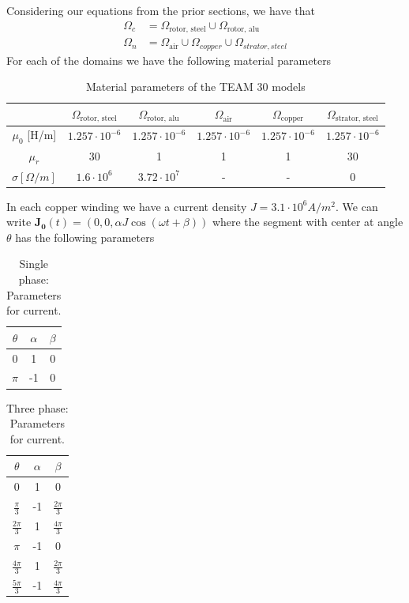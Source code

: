 \documentclass{article}
\newcommand{\mbf}[1]{\mathbf{#1}}
\begin{document}
Considering our equations from the prior sections, we have that
\begin{align}
    \Omega_c &= \Omega_{\text{rotor, steel}}\cup \Omega_{\text{rotor, alu}}\\
    \Omega_n &= \Omega_{\text{air}}\cup \Omega_{copper}\cup \Omega_{strator, steel}
\end{align}
For each of the domains we have the following material parameters
\begin{table}[!ht]
    \centering
    \begin{tabular}{|c|c|c|c|c|c|}\hline
         &  $\Omega_{\text{rotor, steel}}$ &  $\Omega_{\text{rotor, alu}}$ & $\Omega_{\text{air}}$ & $\Omega_{\text{copper}}$ & $\Omega_{\text{strator, steel}}$ \\\hline
        $\mu_0$ [H/m] &   $1.257\cdot 10^{-6}$ & $1.257\cdot 10^{-6}$ & $1.257\cdot 10^{-6}$ & $1.257\cdot 10^{-6}$ &  $1.257\cdot 10^{-6}$\\\hline
        $\mu_r$ & 30 & 1 & 1 & 1 & 30 \\\hline
        $\sigma [\Omega/m]$  & $1.6\cdot10^6$ & $3.72\cdot10^7$ & - & - &0 \\\hline
    \end{tabular}
    \caption{Material parameters of the TEAM 30 models}
    \label{tab:mat_params}
\end{table}

In each copper winding we have a current density $J=3.1\cdot 10^6 A/m^2$.
We can write $\mbf{J_0}(t)=(0,0,\alpha J\cos(\omega t + \beta))$ where the segment with center at angle $\theta$ has the following parameters
\begin{table}[!ht]
    \centering
    \begin{tabular}{|c|c|c|}\hline
    $\theta$& $\alpha$ & $\beta$  \\\hline
    0 & 1 & 0  \\\hline
    $\pi$ & -1 & 0 \\\hline
    \end{tabular}
    \caption{Single phase: Parameters for current.}
    \label{tab:single}
\end{table}

\begin{table}[!ht]
    \centering
    \begin{tabular}{|c|c|c|}\hline
    $\theta$& $\alpha$ & $\beta$  \\\hline
    0 & 1 & 0  \\\hline
    $\frac{\pi}{3}$ & -1 & $\frac{2\pi}{3}$ \\\hline
    $\frac{2\pi}{3}$ & 1 & $\frac{4\pi}{3}$ \\\hline
    $\pi$ & -1 & 0\\\hline
    $\frac{4\pi}{3}$ & 1 & $\frac{2\pi}{3}$ \\\hline
    $\frac{5\pi}{3}$ & -1 & $\frac{4\pi}{3}$\\\hline
    \end{tabular}
    \caption{Three phase: Parameters for current.}
    \label{tab:three}
\end{table}
\end{document}

